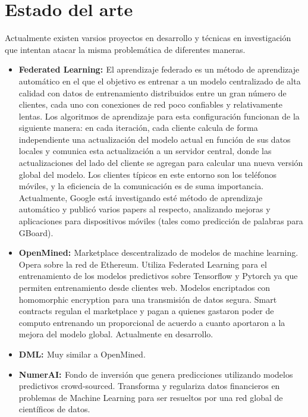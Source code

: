 \documentclass[
11pt, %
oneside, %
spanish, %
singlespacing, %
headsepline, %
chapterinoneline, %
]{MastersDoctoralThesis} %
\begin{document}
\chapter{Estado del arte}

Actualmente existen varsios proyectos en desarrollo y técnicas en investigación que intentan atacar la misma problemática de diferentes maneras.

\begin{itemize}
\item \textbf{Federated Learning: \cite{fedlearn2}} El aprendizaje federado es un método de aprendizaje automático en el que el objetivo es entrenar a un modelo centralizado de alta calidad con datos de entrenamiento distribuidos entre un gran número de clientes, cada uno con conexiones de red poco confiables y relativamente lentas. Los algoritmos de aprendizaje para esta configuración funcionan de la siguiente manera: en cada iteración, cada cliente calcula de forma independiente una actualización del modelo actual en función de sus datos locales y comunica esta actualización a un servidor central, donde las actualizaciones del lado del cliente se agregan para calcular una nueva versión global del modelo. Los clientes típicos en este entorno son los teléfonos móviles, y la eficiencia de la comunicación es de suma importancia. Actualmente, Google está investigando \cite{fedlearn1} \cite{fedlearn3} \cite{fedlearn4} \cite{fedlearn5} \cite{fedlearn6} esté método de aprendizaje automático y publicó varios papers al respecto, analizando mejoras y aplicaciones para dispositivos móviles (tales como predicción de palabras para GBoard).

\item \textbf{OpenMined: \cite{om}} Marketplace descentralizado de modelos de machine learning. Opera sobre la red de Ethereum. Utiliza Federated Learning para el entrenamiento de los modelos predictivos sobre Tensorflow y Pytorch ya que permiten entrenamiento desde clientes web. Modelos encriptados con homomorphic encryption \cite{homenc} para una transmisión de datos segura. 
Smart contracts regulan el marketplace y pagan a quienes gastaron poder de computo entrenando un proporcional de acuerdo a cuanto aportaron a la mejora del modelo global.
Actualmente en desarrollo.

\item \textbf{DML: \cite{dml}} Muy similar a OpenMined.

\item \textbf{NumerAI: \cite{nai}} Fondo de inversión que genera predicciones utilizando modelos predictivos crowd-sourced. Transforma y regulariza datos financieros en problemas de Machine Learning para ser resueltos por una red global de científicos de datos.


\end{itemize}
\end{document}
